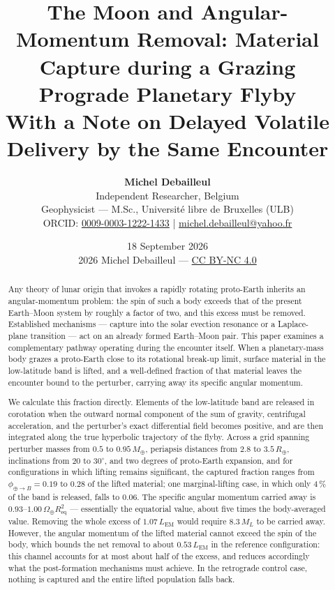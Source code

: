 \documentclass[11pt,a4paper]{article}
\title{\textbf{\Large The Moon and Angular-Momentum Removal: Material Capture during a Grazing Prograde Planetary Flyby}\\
\large With a Note on Delayed Volatile Delivery by the Same Encounter}
\author{\textbf{Michel Debailleul}\\
\small Independent Researcher, Belgium\\
\small Geophysicist --- M.Sc., Université libre de Bruxelles (ULB)\\
\small ORCID: \href{https://orcid.org/0009-0003-1222-1433}{0009-0003-1222-1433} \quad | \quad \href{mailto:michel.debailleul@yahoo.fr}{michel.debailleul@yahoo.fr}
}
\date{18 September 2026\\[4pt]\footnotesize\textcopyright{} 2026 Michel Debailleul --- \href{https://creativecommons.org/licenses/by-nc/4.0/}{CC BY-NC 4.0}}
\begin{document}
\maketitle

\begin{abstract}
Any theory of lunar origin that invokes a rapidly rotating proto-Earth inherits an angular-momentum problem: the spin of such a body exceeds that of the present Earth--Moon system by roughly a factor of two, and this excess must be removed. Established mechanisms --- capture into the solar evection resonance or a Laplace-plane transition --- act on an already formed Earth--Moon pair. This paper examines a complementary pathway operating during the encounter itself. When a planetary-mass body grazes a proto-Earth close to its rotational break-up limit, surface material in the low-latitude band is lifted, and a well-defined fraction of that material leaves the encounter bound to the perturber, carrying away its specific angular momentum.

We calculate this fraction directly. Elements of the low-latitude band are released in corotation when the outward normal component of the sum of gravity, centrifugal acceleration, and the perturber's exact differential field becomes positive, and are then integrated along the true hyperbolic trajectory of the flyby. Across a grid spanning perturber masses from $0.5$ to $0.95\,M_\oplus$, periapsis distances from $2.8$ to $3.5\,R_\oplus$, inclinations from $20$ to $30^\circ$, and two degrees of proto-Earth expansion, and for configurations in which lifting remains significant, the captured fraction ranges from $\phi_{\oplus\to B}=0.19$ to $0.28$ of the lifted material; one marginal-lifting case, in which only $4\,\%$ of the band is released, falls to $0.06$. The specific angular momentum carried away is $0.93$--$1.00\,\Omega_\oplus R_{\mathrm{eq}}^2$ --- essentially the equatorial value, about five times the body-averaged value. Removing the whole excess of $1.07\,L_{\mathrm{EM}}$ would require $8.3\,M_L$ to be carried away. However, the angular momentum of the lifted material cannot exceed the spin of the body, which bounds the net removal to about $0.53\,L_{\mathrm{EM}}$ in the reference configuration: this channel accounts for at most about half of the excess, and reduces accordingly what the post-formation mechanisms must achieve. In the retrograde control case, nothing is captured and the entire lifted population falls back.


\end{abstract}
\end{document}
